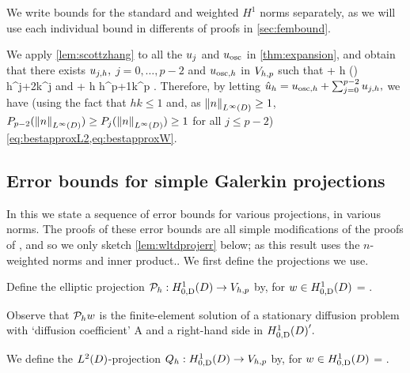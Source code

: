 We write bounds for the standard and weighted $H^1$ norms separately, as we will use each individual bound in differents of proofs in \cref{sec:fembound}.

We apply \cref{lem:scottzhang} to all the $u_{j}$ and $u_{\mathrm{osc}}$ in \cref{thm:expansion}, and obtain that there exists $u_{j,h},$ $j=0,\ldots,p-2$ and $u_{\mathrm{osc},h}$ in $V_{h,p}$ such that 
\beqs
\NLtD{\usj - \ujh} + h\NHoD{\usj - \ujh} \leq {}  \Pj\mleft(\mright) h^{j+2}k^j \Cfg
\eeqs
and
\beqs
\NLtD{\uosc - \uosch} + h\NHoD{\uosc - \uosch} \leq {} \Cosc\CAnk h^{p+1}k^p \Cfg.
\eeqs
Therefore, by letting $\hat{u}_{h} = u_{\mathrm{osc},h} + \sum_{j=0}^{p-2} u_{j,h},$ we have (using the fact that $hk \leq 1$ and, as $\NLiD{n} \geq 1$, $\Pfn{p-2}(\NLiD{n}) \geq \Pfn{j}(\NLiD{n}) \geq 1$ for all $j \leq p-2$) \cref{eq:bestapproxL2,eq:bestapproxW}.
\epf

\subsection{Error bounds for simple Galerkin projections}\label{sec:errgalerkin}
In this  we state a sequence of error bounds for various projections, in various norms. The proofs of these error bounds are all simple modifications of the proofs of \cite[Theorem 5.8.3]{BrSc:08},  and so we only sketch \cref{lem:wltdprojerr} below; as this result uses the $n$-weighted norms and inner product.. %
We first define the projections we use.

Define the elliptic projection $\Ph:\HozDD\rightarrow\Vhp$ by, for $w \in \HozDD$
\beqs
{} =  \tforall \vh \in \Vhp.
\eeqs

Observe that $\mathcal P_{h} w$ is the finite-element solution of a stationary diffusion problem with `diffusion coefficient' A and a right-hand side in $\HozDD'.$

We define the $\LtD$-projection $\Qh:\HozDD\rightarrow \Vhp$ by, for $w \in \HozDD$
\beqs
{} =  \tforall \vh \in \Vhp.
\eeqs

